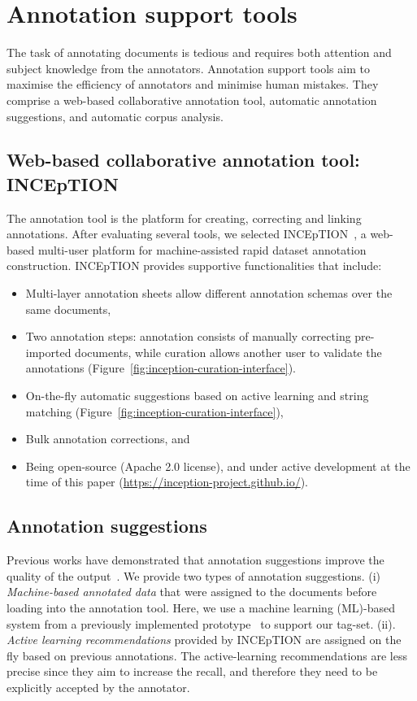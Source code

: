\section{Annotation support tools}
\label{subsec:annotation-support-tool}
The task of annotating documents is tedious and requires both attention and subject knowledge from the annotators.
Annotation support tools aim to maximise the efficiency of annotators and minimise human mistakes. 
They comprise a web-based collaborative annotation tool, automatic annotation suggestions, and automatic corpus analysis. 

\subsection{Web-based collaborative annotation tool: INCEpTION}
\label{subsec:annotation-tool}

The annotation tool is the platform for creating, correcting and linking annotations.
After evaluating several tools, we selected INCEpTION~\cite{tubiblio106270,eckart-de-castilho-etal-2016-web}, a web-based multi-user platform for machine-assisted rapid dataset annotation construction. 
INCEpTION provides supportive functionalities that include: 
\begin{itemize}
    \item Multi-layer annotation sheets allow different annotation schemas over the same documents, 
    \item Two annotation steps: annotation consists of manually correcting pre-imported documents, while curation allows another user to validate the annotations (Figure~\ref{fig:inception-curation-interface}). 
    \item On-the-fly automatic suggestions based on active learning and string matching (Figure~\ref{fig:inception-curation-interface}), 
    \item Bulk annotation corrections, and 
    \item Being open-source (Apache 2.0 license), and under active development at the time of this paper (\url{https://inception-project.github.io/}).
\end{itemize}

\subsection{Annotation suggestions}
\label{subsec:automatic-system-prototype}

Previous works have demonstrated that annotation suggestions improve the quality of the output~\cite{Fort2010InfluenceOP, Nvol2011SemiautomaticSA, Lingren2014EvaluatingTI}.
We provide two types of annotation suggestions. 
(i) \textit{Machine-based annotated data} that were assigned to the documents before loading into the annotation tool. Here, we use a machine learning (ML)-based system from a previously implemented prototype~\cite{foppiano2019proposal} to support our tag-set. 
(ii). \textit{Active learning recommendations} provided by INCEpTION are assigned on the fly based on previous annotations. 
The active-learning recommendations are less precise since they aim to increase the recall, and therefore they need to be explicitly accepted by the annotator.


